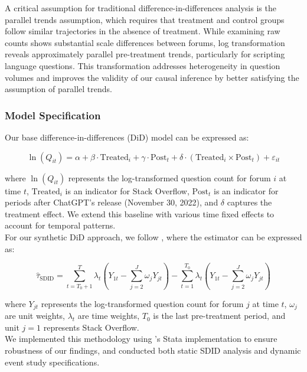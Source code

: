 A critical assumption for traditional difference-in-differences analysis is the parallel trends assumption, which requires that treatment and control groups follow similar trajectories in the absence of treatment. While examining raw counts shows substantial scale differences between forums, log transformation reveals approximately parallel pre-treatment trends, particularly for scripting language questions. This transformation addresses heterogeneity in question volumes and improves the validity of our causal inference by better satisfying the assumption of parallel trends.

\subsubsection{Model Specification}
Our base difference-in-differences (DiD) model can be expressed as:

\begin{equation}
\ln(Q_{it}) = \alpha + \beta \cdot \text{Treated}_i + \gamma \cdot \text{Post}_t + \delta \cdot (\text{Treated}_i \times \text{Post}_t) + \varepsilon_{it}
\end{equation}

where $\ln(Q_{it})$ represents the log-transformed question count for forum $i$ at time $t$, $\text{Treated}_i$ is an indicator for Stack Overflow, $\text{Post}_t$ is an indicator for periods after ChatGPT's release (November 30, 2022), and $\delta$ captures the treatment effect. We extend this baseline with various time fixed effects to account for temporal patterns.\\

For our synthetic DiD approach, we follow \textcite{arkhangelsky_synthetic_2021}, where the estimator can be expressed as:

\begin{equation}
\hat{\tau}_{\text{SDID}} = \sum_{t=T_0+1}^T \lambda_t \left( Y_{1t} - \sum_{j=2}^J \omega_j Y_{jt} \right) - \sum_{t=1}^{T_0} \lambda_t \left( Y_{1t} - \sum_{j=2}^J \omega_j Y_{jt} \right)
\end{equation}

where $Y_{jt}$ represents the log-transformed question count for forum $j$ at time $t$, $\omega_j$ are unit weights, $\lambda_t$ are time weights, $T_0$ is the last pre-treatment period, and unit $j=1$ represents Stack Overflow.\\

We implemented this methodology using \textcite{clarke_synthetic_2023}'s Stata implementation to ensure robustness of our findings, and conducted both static SDID analysis and dynamic event study specifications.

